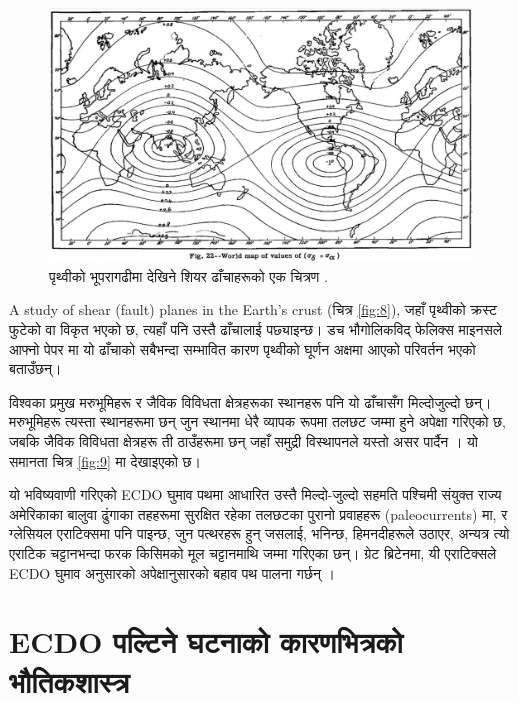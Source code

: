 \documentclass[10pt,twocolumn,letterpaper]{article}
\begin{document}
\begin{figure}[t]
\begin{center}
   \includegraphics[width=1\linewidth]{meinesz3.jpg}
\end{center}
   \caption{पृथ्वीको भूपरागढीमा देखिने शियर ढाँचाहरूको एक चित्रण \cite{36}.}
\label{fig:8}
\label{fig:onecol}
\end{figure}
A study of shear (fault) planes in the Earth's crust (चित्र \ref{fig:8}), जहाँ पृथ्वीको क्रस्ट फुटेको वा विकृत भएको छ, त्यहाँ पनि उस्तै ढाँचालाई पछ्याइन्छ। डच भौगोलिकविद् फेलिक्स माइनसले आफ्नो पेपर \cite{36} मा यो ढाँचाको सबैभन्दा सम्भावित कारण पृथ्वीको घूर्णन अक्षमा आएको परिवर्तन भएको बताउँछन्।

विश्वका प्रमुख मरुभूमिहरू र जैविक विविधता क्षेत्रहरूका स्थानहरू पनि यो ढाँचासँग मिल्दोजुल्दो छन्। मरुभूमिहरू त्यस्ता स्थानहरूमा छन् जुन स्थानमा धेरै व्यापक रूपमा तलछट जम्मा हुने अपेक्षा गरिएको छ, जबकि जैविक विविधता क्षेत्रहरू ती ठाउँहरूमा छन् जहाँ समुद्री विस्थापनले यस्तो असर पार्दैन \cite{28}। यो समानता चित्र \ref{fig:9} मा देखाइएको छ।

यो भविष्यवाणी गरिएको ECDO घुमाव पथमा आधारित उस्तै मिल्दो-जुल्दो सहमति पश्चिमी संयुक्त राज्य अमेरिकाका बालुवा ढुंगाका तहहरूमा सुरक्षित रहेका तलछटका पुरानो प्रवाहहरू (paleocurrents) मा, र ग्लेसियल एराटिक्समा पनि पाइन्छ, जुन पत्थरहरू हुन् जसलाई, भनिन्छ, हिमनदीहरूले उठाएर, अन्यत्र त्यो एराटिक चट्टानभन्दा फरक किसिमको मूल चट्टानमाथि जम्मा गरिएका छन्। ग्रेट ब्रिटेनमा, यी एराटिक्सले ECDO घुमाव अनुसारको अपेक्षानुसारको बहाव पथ पालना गर्छन् \cite{67,68}।

\section{ECDO पल्टिने घटनाको कारणभित्रको भौतिकशास्त्र}
\end{document}
